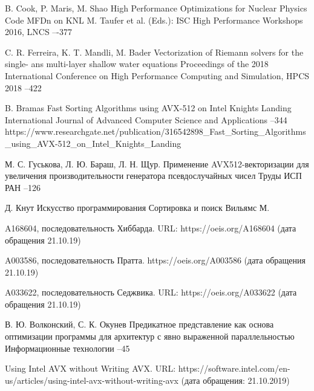 \documentclass[utf8]{psta}
\begin{document}
\begin{thebibliography}{30}
\by B. Cook, P. Maris, M. Shao
\paper High Performance Optimizations for Nuclear Physics Code MFDn on KNL
\jour M. Taufer et al. (Eds.): ISC High Performance Workshops 2016, LNCS
–-377

\by C. R. Ferreira, K. T. Mandli, M. Bader
\paper Vectorization of Riemann solvers for the single- ans multi-layer shallow water equations
\jour Proceedings of the 2018 International Conference on High Performance Computing and Simulation, HPCS 2018
--422

\by B. Bramas
\paper Fast Sorting Algorithms using AVX-512 on Intel Knights Landing
\jour International Journal of Advanced Computer Science and Applications
--344
\URL https://www.researchgate.net/publication/316542898_Fast_Sorting_Algorithms_using_AVX-512_on_Intel_Knights_Landing

\by М. С. Гуськова, Л. Ю. Бараш, Л. Н. Щур.
\paper Применение AVX512-векторизации для увеличения производительности генератора псевдослучайных чисел
\jour Труды ИСП РАН
--126


\by Д. Кнут
\book Искусство программирования
\voltitle Сортировка и поиск
\publ Вильямс
\publaddr М.

\by
A168604, последовательность Хиббарда. URL: https://oeis.org/A168604 (дата обращения 21.10.19)

\by
A003586, последовательность Пратта. https://oeis.org/A003586 (дата обращения 21.10.19)

\by
A033622, последовательность Седжвика. URL: https://oeis.org/A033622 (дата обращения 21.10.19)


\by В. Ю. Волконский, С. К. Окунев
\paper Предикатное представление как основа оптимизации программы для архитектур с явно выраженной параллельностью
\jour Информационные технологии
--45

\by
Using Intel AVX without Writing AVX. URL: https://software.intel.com/en-us/articles/using-intel-avx-without-writing-avx (дата обращения: 21.10.2019)

\end{thebibliography}
\end{document}
